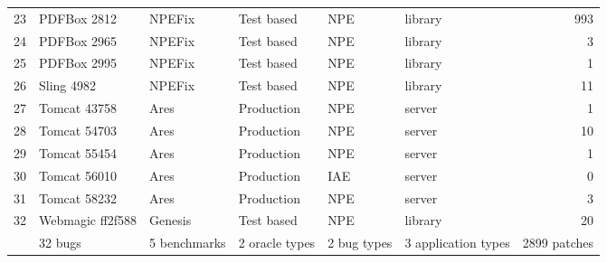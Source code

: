 \begin{table}
\begin{tabular}{|r|l|l|l|l|l|r|}
    23 & PDFBox 2812 & NPEFix & Test based & NPE & library & 993 \\
    24 & PDFBox 2965 & NPEFix & Test based & NPE & library & 3 \\
    25 & PDFBox 2995 & NPEFix & Test based & NPE & library & 1 \\
    26 & Sling 4982 & NPEFix & Test based & NPE & library & 11 \\
    27 & Tomcat 43758 & Ares & Production & NPE & server & 1 \\
    28 & Tomcat 54703 & Ares & Production & NPE & server & 10 \\
    29 & Tomcat 55454 & Ares & Production & NPE & server & 1 \\
    30 & Tomcat 56010 & Ares & Production & IAE & server & 0 \\
    31 & Tomcat 58232 & Ares & Production & NPE & server & 3 \\
    32 & Webmagic ff2f588 & Genesis & Test based & NPE & library & 20 \\
    \hline
    & 32 bugs & 5 benchmarks & 2 oracle types & 2 bug types & 3 application types & 2899 patches \\
    \hline
  \end{tabular}
\end{table}